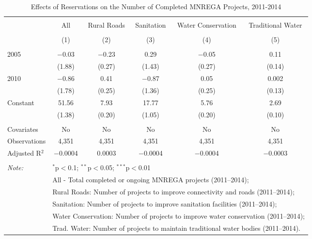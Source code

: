 
\begin{table}[!htbp] \centering 
  \caption{Effects of Reservations on the Number of Completed MNREGA Projects, 2011-2014} 
  \label{main_mnrega} 
\scriptsize 
\begin{tabular}{@{\extracolsep{1pt}}lccccc} 
\\[-1.8ex]\hline 
\hline \\[-1.8ex] 
 & All & Rural Roads & Sanitation & Water Conservation & Traditional Water \\ 
\\[-1.8ex] & (1) & (2) & (3) & (4) & (5)\\ 
\hline \\[-1.8ex] 
 2005 & $-$0.03 & $-$0.23 & 0.29 & $-$0.05 & 0.11 \\ 
  & (1.88) & (0.27) & (1.43) & (0.27) & (0.14) \\ 
  2010 & $-$0.86 & 0.41 & $-$0.87 & 0.05 & 0.002 \\ 
  & (1.78) & (0.25) & (1.36) & (0.25) & (0.13) \\ 
  Constant & 51.56 & 7.93 & 17.77 & 5.76 & 2.69 \\ 
  & (1.38) & (0.20) & (1.05) & (0.20) & (0.10) \\ 
 \hline \\[-1.8ex] 
Covariates & No & No & No & No & No \\ 
Observations & 4,351 & 4,351 & 4,351 & 4,351 & 4,351 \\ 
Adjusted R$^{2}$ & $-$0.0004 & 0.0003 & $-$0.0004 & $-$0.0004 & $-$0.0003 \\ 
\hline 
\hline \\[-1.8ex] 
\textit{Note:}  & \multicolumn{5}{l}{$^{*}$p$<$0.1; $^{**}$p$<$0.05; $^{***}$p$<$0.01} \\ 
 & \multicolumn{5}{l}{All - Total completed or ongoing MNREGA projects (2011--2014);} \\ 
 & \multicolumn{5}{l}{Rural Roads: Number of projects to improve connectivity and roads (2011--2014);} \\ 
 & \multicolumn{5}{l}{Sanitation:  Number of projects to improve sanitation facilities  (2011--2014);} \\ 
 & \multicolumn{5}{l}{Water Conservation: Number of projects to improve water conservation (2011--2014);} \\ 
 & \multicolumn{5}{l}{Trad. Water: Number of projects to maintain traditional water bodies (2011--2014).} \\ 
\end{tabular} 
\end{table} 
